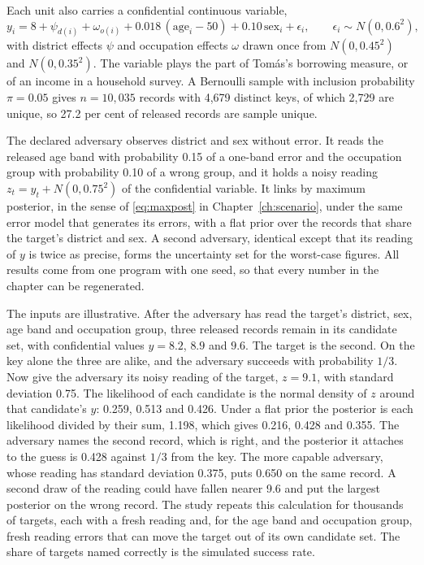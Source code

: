 Each unit also carries a confidential continuous variable,
\begin{equation}\label{c11:eq-y}
y_i = 8 + \psi_{d(i)} + \omega_{o(i)} + 0.018\,(\mathrm{age}_i - 50)
+ 0.10\,\mathrm{sex}_i + \epsilon_i ,\qquad \epsilon_i \sim N(0, 0.6^2),
\end{equation}
with district effects $\psi$ and occupation effects $\omega$ drawn once from
$N(0, 0.45^2)$ and $N(0, 0.35^2)$.
The variable plays the part of Tomás's borrowing measure, or of an income in a
household survey. A Bernoulli sample with inclusion probability $\pi = 0.05$ gives
$n = 10{,}035$ records with 4,679 distinct keys, of which 2,729 are unique, so 27.2
per cent of released records are sample unique.

The declared adversary observes district and sex without error. It reads the
released age band with probability 0.15 of a one-band error and the occupation
group with probability 0.10 of a wrong group, and it holds a noisy reading
$z_t = y_t + N(0, 0.75^2)$ of the confidential variable.
It links by maximum posterior, in the sense of \eqref{eq:maxpost} in
Chapter~\ref{ch:scenario}, under the same error model that generates its errors,
with a flat prior over the records that share the target's district and sex. A
second adversary, identical except that its reading of $y$ is twice as precise,
forms the uncertainty set for the worst-case figures. All results come from one
program with one seed, so that every number in the chapter can be regenerated.

\begin{example}\label{c11:ex-target}
The inputs are illustrative. After the adversary has read the target's district, sex, age
band and occupation group, three released records remain in its candidate set, with
confidential values $y = 8.2$, $8.9$ and $9.6$. The target is the second. On the key alone
the three are alike, and the adversary succeeds with probability $1/3$. Now give the
adversary its noisy reading of the target, $z = 9.1$, with standard deviation 0.75. The
likelihood of each candidate is the normal density of $z$ around that candidate's $y$:
0.259, 0.513 and 0.426. Under a flat prior the posterior is each likelihood divided by
their sum, 1.198, which gives 0.216, 0.428 and 0.355. The adversary names the second
record, which is right, and the posterior it attaches to the guess is 0.428 against $1/3$
from the key. The more capable adversary, whose reading has standard deviation 0.375,
puts 0.650 on the same record. A second draw of the reading could have fallen nearer 9.6
and put the largest posterior on the wrong record. The study repeats this calculation for
thousands of targets, each with a fresh reading and, for the age band and occupation
group, fresh reading errors that can move the target out of its own candidate set. The
share of targets named correctly is the simulated success rate.
\end{example}


